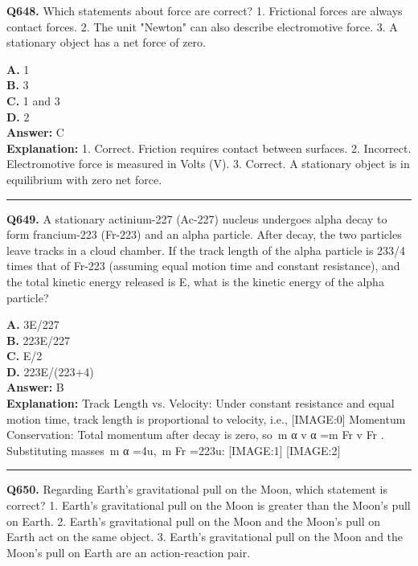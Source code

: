 \documentclass[12pt]{article}
\begin{document}
\noindent
\textbf{Q648.} Which statements about force are correct?
1.
Frictional forces are always contact forces.
2.
The unit "Newton" can also describe electromotive force.
3.
A stationary object has a net force of zero.



\textbf{A.} 1 \\
\textbf{B.} 3 \\
\textbf{C.} 1 and 3 \\
\textbf{D.} 2 \\

\textbf{Answer:} C \\
\textbf{Explanation:} 1.
Correct. Friction requires contact between surfaces.
2.
Incorrect. Electromotive force is measured in Volts (V).
3.
Correct. A stationary object is in equilibrium with zero net force.

\hrule
\vspace{1em}


\noindent
\textbf{Q649.} A stationary actinium-227 (Ac-227) nucleus undergoes alpha decay to form francium-223 (Fr-223) and an alpha particle. After decay, the two particles leave tracks in a cloud chamber. If the track length of the alpha particle is 233/4 times that of Fr-223 (assuming equal motion time and constant resistance), and the total kinetic energy released is E, what is the kinetic energy of the alpha particle?



\textbf{A.} 3E/227 \\
\textbf{B.} 223E/227 \\
\textbf{C.} E/2 \\
\textbf{D.} 223E/(223+4) \\

\textbf{Answer:} B \\
\textbf{Explanation:} Track Length vs. Velocity: Under constant resistance and equal motion time, track length is proportional to velocity, i.e.,
[IMAGE:0]
Momentum Conservation: Total momentum after decay is zero, so m
α
v
α
=m
Fr
v
Fr
​. Substituting masses m
α
=4u, m
Fr
=223u:
[IMAGE:1]
[IMAGE:2]

\hrule
\vspace{1em}


\noindent
\textbf{Q650.} Regarding Earth's gravitational pull on the Moon, which statement is correct?
1.
Earth's gravitational pull on the Moon is greater than the Moon's pull on Earth.
2.
Earth's gravitational pull on the Moon and the Moon's pull on Earth act on the same object.
3.
Earth's gravitational pull on the Moon and the Moon's pull on Earth are an action-reaction pair.
\end{document}
